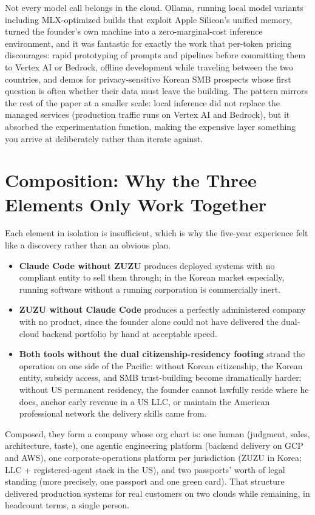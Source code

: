 \documentclass{article}
\begin{document}
Not every model call belongs in the cloud. Ollama, running local model variants including MLX-optimized builds that exploit Apple Silicon's unified memory, turned the founder's own machine into a zero-marginal-cost inference environment, and it was fantastic for exactly the work that per-token pricing discourages: rapid prototyping of prompts and pipelines before committing them to Vertex AI or Bedrock, offline development while traveling between the two countries, and demos for privacy-sensitive Korean SMB prospects whose first question is often whether their data must leave the building. The pattern mirrors the rest of the paper at a smaller scale: local inference did not replace the managed services (production traffic runs on Vertex AI and Bedrock), but it absorbed the experimentation function, making the expensive layer something you arrive at deliberately rather than iterate against.

\section{Composition: Why the Three Elements Only Work Together}

Each element in isolation is insufficient, which is why the five-year experience felt like a discovery rather than an obvious plan.

\begin{itemize}
    \item \textbf{Claude Code without ZUZU} produces deployed systems with no compliant entity to sell them through; in the Korean market especially, running software without a running corporation is commercially inert.
    \item \textbf{ZUZU without Claude Code} produces a perfectly administered company with no product, since the founder alone could not have delivered the dual-cloud backend portfolio by hand at acceptable speed.
    \item \textbf{Both tools without the dual citizenship-residency footing} strand the operation on one side of the Pacific: without Korean citizenship, the Korean entity, subsidy access, and SMB trust-building become dramatically harder; without US permanent residency, the founder cannot lawfully reside where he does, anchor early revenue in a US LLC, or maintain the American professional network the delivery skills came from.
\end{itemize}

Composed, they form a company whose org chart is: one human (judgment, sales, architecture, taste), one agentic engineering platform (backend delivery on GCP and AWS), one corporate-operations platform per jurisdiction (ZUZU in Korea; LLC + registered-agent stack in the US), and two passports' worth of legal standing (more precisely, one passport and one green card). That structure delivered production systems for real customers on two clouds while remaining, in headcount terms, a single person.
\end{document}
